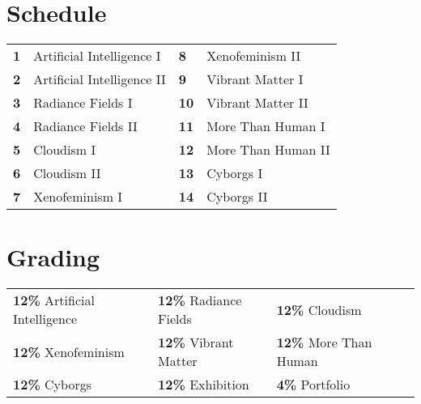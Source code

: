 \documentclass[11pt,article,oneside]{memoir}
\begin{document}
\section{Schedule}

\begin{table}[H]
\begin{tabular}{l l l l}
\textbf{1} & Artificial Intelligence I  \hspace{4em}  & \textbf{8} & Xenofeminism II \\
\textbf{2} & Artificial Intelligence II \hspace{4em}  & \textbf{9} & Vibrant Matter I \\
\textbf{3} & Radiance Fields I \hspace{4em}  & \textbf{10} & Vibrant Matter II \\
\textbf{4} & Radiance Fields II \hspace{4em}  & \textbf{11} & More Than Human I \\
\textbf{5} & Cloudism I \hspace{4em}  & \textbf{12} & More Than Human II \\
\textbf{6} & Cloudism II \hspace{4em}  & \textbf{13} & Cyborgs I \\
\textbf{7} & Xenofeminism I  \hspace{4em}  & \textbf{14} & Cyborgs II\\
\end{tabular}
\end{table}




\section{Grading}

\begin{table}[H]
\begin{tabular}{l @{\hskip 1cm} l @{\hskip 1cm} l @{\hskip 1cm} l}
\textbf{12\%} \enspace Artificial Intelligence & \textbf{12\%} \enspace Radiance Fields & \textbf{12\%} \enspace Cloudism \\
\textbf{12\%} \enspace Xenofeminism & \textbf{12\%} \enspace Vibrant Matter & \textbf{12\%} \enspace More Than Human \\
\textbf{12\%} \enspace Cyborgs & \textbf{12\%} \enspace Exhibition & \textbf{4\%} \quad Portfolio \\
\end{tabular}
\end{table}
\end{document}
